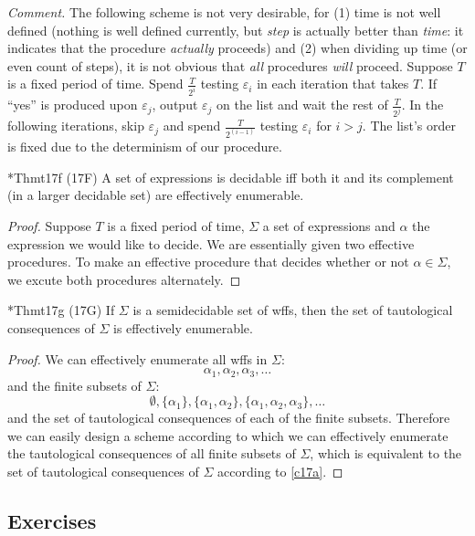 \textit{Comment.} The following scheme is not very desirable, for (1) time is not well defined (nothing is well defined currently, but \textit{step} is actually better than \textit{time}: it indicates that the procedure \textit{actually} proceeds) and (2) when dividing up time (or even count of steps), it is not obvious that \textit{all} procedures \textit{will} proceed. Suppose $T$ is a fixed period of time. Spend $\frac{T}{2^i}$ testing $\varepsilon_i$ in each iteration that takes $T$. If ``yes'' is produced upon $\varepsilon_j$, output $\varepsilon_j$ on the list and wait the rest of $\frac{T}{2^j}$. In the following iterations, skip $\varepsilon_j$ and spend $\frac{T}{2^{(i-1)}}$ testing $\varepsilon_i$ for $i>j$. The list's order is fixed due to the determinism of our procedure.

\begin{reference}{*Thm}{t17f}
  (17F) A set of expressions is decidable iff both it and its complement (in a larger decidable set) are effectively enumerable.
\end{reference}

\begin{proof}
  Suppose $T$ is a fixed period of time, $\Sigma$ a set of expressions and $\alpha$ the expression we would like to decide. We are essentially given two effective procedures. To make an effective procedure that decides whether or not $\alpha\in \Sigma$, we excute both procedures alternately.
\end{proof}

\begin{reference}{*Thm}{t17g}
  (17G) If $\Sigma$ is a semidecidable set of wffs, then the set of tautological consequences of $\Sigma$ is effectively enumerable.
\end{reference}

\begin{proof}
  We can effectively enumerate all wffs in $\Sigma$:
  \[
    \alpha_1,\alpha_2,\alpha_3,\dots
  \]
  and the finite subsets of $\Sigma$:
  \[
    \emptyset,\{\alpha_1\},\{\alpha_1,\alpha_2\},\{\alpha_1,\alpha_2,\alpha_3\},\dots
  \]
  and the set of tautological consequences of each of the finite subsets. Therefore we can easily design a scheme according to which we can effectively enumerate the tautological consequences of all finite subsets of $\Sigma$, which is equivalent to the set of tautological consequences of $\Sigma$ according to \ref{c17a}.
\end{proof}

\subsection*{Exercises}

